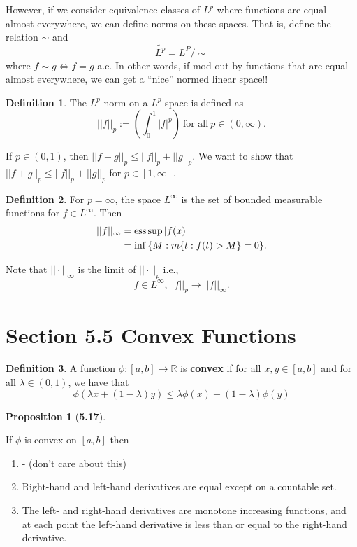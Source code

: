 \documentclass[12pt]{article}
\newcommand{\R}{\mathbb{R}}
\def\ess{\mathop{\rm ess}\nolimits}
\theoremstyle{definition}
\newtheorem*{definition}{Definition}
\newtheorem*{prop}{Proposition}
\begin{document}
However, if we consider equivalence classes of \( L^p \) where functions are equal almost everywhere, we can define norms on these spaces. That is, define the relation \( \sim \) and 
    \[
        \tilde{L^{p}} = L^{P}\bigr/\sim
    \]
where \( f \sim g \Leftrightarrow f = g \) a.e. In other words, if mod out by functions that are equal almost everywhere, we can get a ``nice'' normed linear space!!

\begin{definition}
    The \( L^p \)-norm on a \( L^p \) space is defined as 
        \[
            || f ||_{p} := \left( \int_{0}^{1}|f|^{p} \right) \ \text{for all} \ p \in (0, \infty).
        \]
\end{definition}

If \( p \in (0,1 ) \), then \( ||f+ g||_{p} \leq ||f||_{p} + ||g||_{p}\). We want to show that \( ||f + g||_{p} \leq ||f||_{p} + ||g||_{p} \) for \( p \in [1, \infty] \).

\begin{definition}
    For \( p = \infty \), the space \( L^{\infty }\) is the set of bounded measurable functions for \( f \in L^{\infty} \). Then
        \begin{align*}
            ||f||_{\infty} &= \ess \sup |f(x)|   \\
                           &= \inf \left\{ M : m\{t: f(t) > M \right\} = 0\}.
        \end{align*}
\end{definition}

Note that \( ||\cdot||_{\infty} \) is the limit of \( ||\cdot||_{p} \) i.e., 
    \[
        f \in L^{\infty}, ||f||_{p} \to ||f||_{\infty}.  
    \]

\section*{Section 5.5 Convex Functions}

\begin{definition}
    A function \( \phi: [a,b] \to \R  \) is \textbf{convex} if for all \( x,y \in [a,b] \) and for all \( \lambda \in (0,1) \), we have that 
        \[
            \phi(\lambda x + (1-\lambda)y) \leq \lambda \phi(x) + (1-\lambda)\phi(y)  
        \]  
\end{definition}

\begin{prop}[\textbf{5.17}]\

    If \( \phi \) is convex on \( [a,b] \) then 
        \begin{enumerate}[label = (\arabic{*})]
            \item - (don't care about this)
            \item Right-hand and left-hand derivatives are equal except on a countable set. 
            \item The left- and right-hand derivatives are monotone increasing functions, and at each point the left-hand derivative is less than or equal to the right-hand derivative.
        \end{enumerate}
    
\end{prop}
\end{document}
